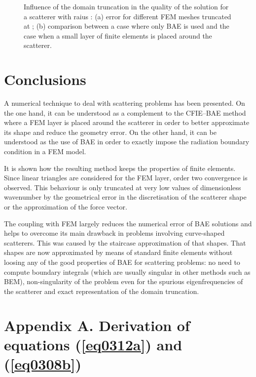 \documentclass[12pt]{article}
\begin{document}
\begin{figure}[ht]
 
\caption{Influence of the domain truncation in the quality of the solution for a scatterer with raius : (a) error for different FEM meshes truncated at ; (b) comparison between a case where only BAE is used and the case when a small layer of finite elements is placed around the scatterer.}
\label{fig:InfluenceOfBoxSize}
\end{figure}



\section{Conclusions}
\label{sec:conclusions}

A numerical technique to deal with scattering problems has been presented. On the one hand, it can be understood as a complement to the CFIE--BAE method where a FEM layer is placed around the scatterer in order to better approximate its shape and reduce the geometry error. On the other hand, it can be understood as the use of BAE in order to exactly impose the radiation boundary condition in a FEM model.

It is shown how the resulting method keeps the properties of finite elements. Since linear triangles are considered for the FEM layer, order two convergence is observed. This behaviour is only truncated at very low values of dimensionless wavenumber  by the geometrical error in the discretisation of the scatterer shape or the approximation of the force vector.

The coupling with FEM largely reduces the numerical error of BAE solutions and helps to overcome its main drawback in problems involving curve-shaped scatterers. This was caused by the staircase approximation of that shapes. That shapes are now approximated by means of standard finite elements without loosing any of the good properties of BAE for scattering problems: no need to compute boundary integrals (which are usually singular in other methods such as BEM), non-singularity of the problem even for the spurious eigenfrequencies of the scatterer and exact representation of the domain truncation.



\appendix
\section{Appendix A. Derivation of equations (\ref{eq0312a}) and (\ref{eq0308b})}
\label{sec:AppA}
\end{document}
